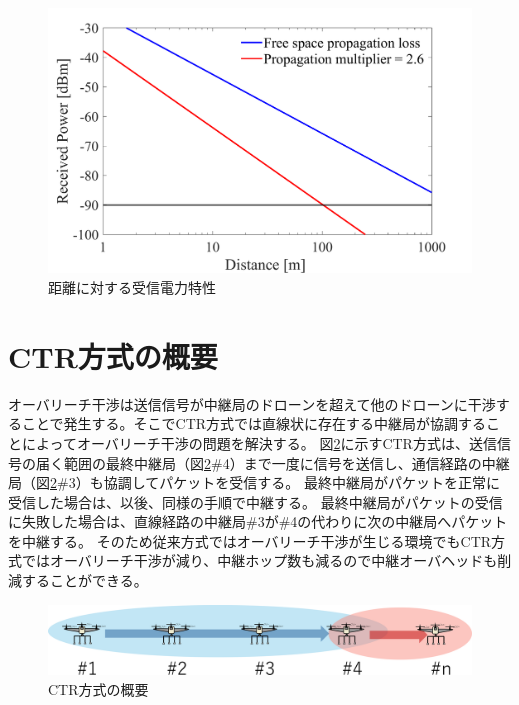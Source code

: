 \documentclass[a4paper,10.5pt]{ltjsarticle}
\begin{document}
\begin{figure}[H]
  \centering
  \includegraphics[width=\linewidth]{lfsp_vs_distance_3.pdf} %
  \caption{距離に対する受信電力特性}
  \label{fig:lfsp_vs_distance_3} %
\end{figure}

\clearpage
\section{CTR方式の概要}

オーバリーチ干渉は送信信号が中継局のドローンを超えて他のドローンに干渉することで発生する。そこでCTR方式では直線状に存在する中継局が協調することによってオーバリーチ干渉の問題を解決する。
図\ref{fig:CTR_topology}に示すCTR方式は、送信信号の届く範囲の最終中継局（図\ref{fig:CTR_topology}\#4）まで一度に信号を送信し、通信経路の中継局（図\ref{fig:CTR_topology}\#3）も協調してパケットを受信する。
最終中継局がパケットを正常に受信した場合は、以後、同様の手順で中継する。
最終中継局がパケットの受信に失敗した場合は、直線経路の中継局\#3が\#4の代わりに次の中継局へパケットを中継する。
そのため従来方式ではオーバリーチ干渉が生じる環境でもCTR方式ではオーバリーチ干渉が減り、中継ホップ数も減るので中継オーバヘッドも削減することができる。

\begin{figure}[H]
  \centering
  \includegraphics[width=\linewidth]{CTR_topology.pdf} %
  \caption{CTR方式の概要}
  \label{fig:CTR_topology} %
\end{figure}
\end{document}

